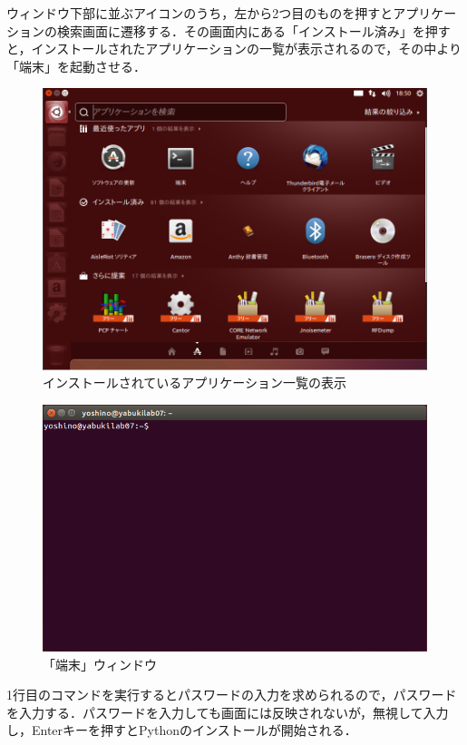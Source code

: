 ウィンドウ下部に並ぶアイコンのうち，左から2つ目のものを押すとアプリケーションの検索画面に遷移する．その画面内にある「インストール済み」を押すと，インストールされたアプリケーションの一覧が表示されるので，その中より「端末」を起動させる．

\begin{figure}[H]
\centering
\includegraphics[width=13cm]{super2.PNG}
\caption{インストールされているアプリケーション一覧の表示}\label{super2}
\end{figure}

\begin{figure}[H]
\centering
\includegraphics[width=13cm]{terminal.PNG}
\caption{「端末」ウィンドウ}\label{terminal}
\end{figure}

1行目のコマンドを実行するとパスワードの入力を求められるので，パスワードを入力する．パスワードを入力しても画面には反映されないが，無視して入力し，Enterキーを押すとPythonのインストールが開始される．
	
